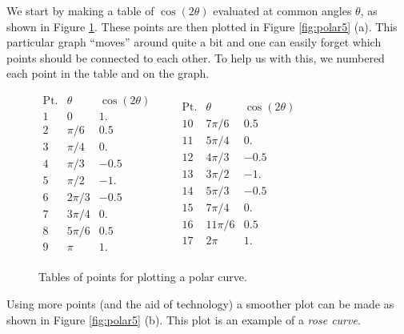{We start by making a table of $\cos (2\theta)$ evaluated at common angles $\theta$, as shown in Figure \ref{fig:polar5table}. These points are then plotted in Figure \ref{fig:polar5} (a). This particular graph ``moves'' around quite a bit and one can easily forget which points should be connected to each other. To help us with this, we numbered each point in the table and on the graph. 
\clearpage

\begin{figure}[!ht]%
$\begin{array}{ccc}
\text{Pt.} & \theta & \cos (2\theta)\\ \hline
 1 & 0 & 1. \\
 2 & \pi /6 & 0.5 \\
 3 & \pi /4 & 0. \\
 4 & \pi /3 & -0.5 \\
 5 & \pi /2 & -1. \\
 6 & 2 \pi /3 & -0.5 \\
 7 & 3 \pi /4 & 0. \\
 8 & 5 \pi /6 & 0.5 \\
 9 & \pi  & 1. \\
\end{array}
\qquad
\begin{array}{ccc}
\text{Pt.} & \theta & \cos (2\theta)\\ \hline
 10 & 7 \pi /6 & 0.5 \\
 11 & 5 \pi /4 & 0. \\
 12 & 4 \pi /3 & -0.5 \\
 13 & 3 \pi /2 & -1. \\
 14 & 5 \pi /3 & -0.5 \\
 15 & 7 \pi /4 & 0. \\
 16 & 11 \pi /6 & 0.5 \\
 17 & 2 \pi  & 1. \\
\end{array}$
\captionsetup{type=figure}
\caption{Tables of points for plotting a polar curve.}\label{fig:polar5table}
\end{figure}%
Using more points (and the aid of technology) a smoother plot can be made as shown in Figure \ref{fig:polar5} (b). This plot is an example of a \textit{rose curve}.
}\\

